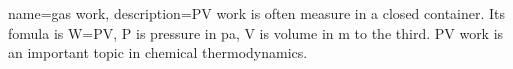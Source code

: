 {
name=gas work,
    description={PV work is often measure in a closed container. Its fomula is W=PV, P is pressure in pa, V is volume in m to the third. PV work is an important topic in chemical thermodynamics.}
}
